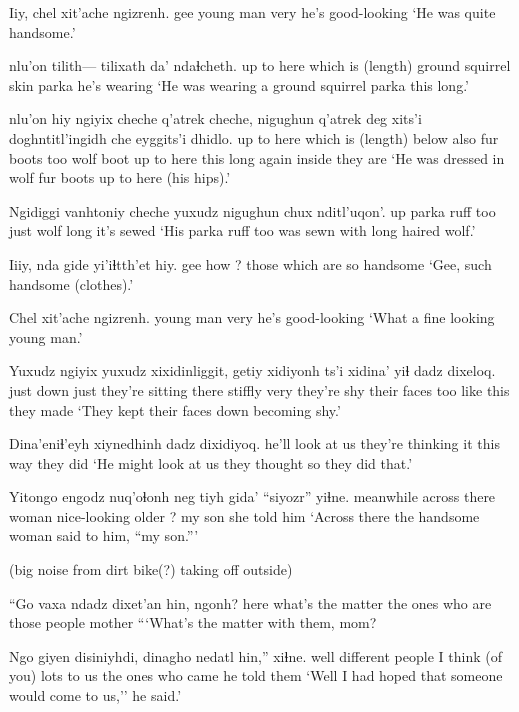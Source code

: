 \documentclass[12pt]{article}
\begin{document}
\gll Iiy, chel xit'ache ngizrenh.
gee {young man} very {he's good-looking}
\glt `He was quite handsome.'
\glend

 nlu'on tilith--- {tilixath} da' ndaɬcheth.
{up to here}  {which is (length)} {} {ground squirrel skin} parka {he's wearing}
\glt `He was wearing a ground squirrel parka this long.'
\glend

 {nlu'on hiy} ngiyix cheche q'atrek cheche, nigughun q'atrek {deg xits'i} doghntitl'ingidh che {eyggits'i} dhidlo.
{up to here} {which is (length)} below also {fur boots} too wolf boot {up to here} {this long} again inside {they are}
\glt `He was dressed in wolf fur boots up to here (his hips).'
\glend

\gll Ngidiggi vanhtoniy cheche yuxudz nigughun chux nditl'uqon'.
up {parka ruff} too just wolf long {it's sewed}
\glt `His parka ruff too was sewn with long haired wolf.'
\glend

\gll Iiiy, nda gide {yi'iɬtth'et hiy.}
gee how ? {those which are so handsome}
\glt `Gee, such handsome (clothes).'
\glend

\gll Chel xit'ache ngizrenh.
{young man} very {he's good-looking}
\glt `What a fine looking young man.'
\glend

\gll Yuxudz ngiyix yuxudz xixidinliggit, getiy xidiyonh ts'i xidina' yiɬ dadz dixeloq.
just down just {they're sitting there stiffly} very {they're shy} {} {their faces} too {like this} {they made}
\glt `They kept their faces down becoming shy.'
\glend

\gll Dina'eniɬ'eyh xiynedhinh dadz dixidiyoq.
{he'll look at us} {they're thinking it} {this way} {they did}
\glt `He might look at us they thought so they did that.'
\glend

\gll Yitongo engodz nuq'oɬonh neg tiyh gida' ``siyozr'' yiɬne.
meanwhile {across there} woman {nice-looking} older ? {my son} {she told him}
\glt `Across there the handsome woman said to him, ``my son.'''
\glend

(big noise from dirt bike(?) taking off outside)

\gll ``Go {vaxa ndadz} dixet'an hin, ngonh?
here {what's the matter} {the ones who are} {those people} mother
\glt ```What's the matter with them, mom?
\glend

\gll Ngo giyen disiniyhdi, dinagho {nedatl hin},'' xiɬne.
well {different people} {I think (of you) lots} {to us} {the ones who came} {he told them}
\glt `Well I had hoped that someone would come to us,'' he said.'
\glend
\end{document}
